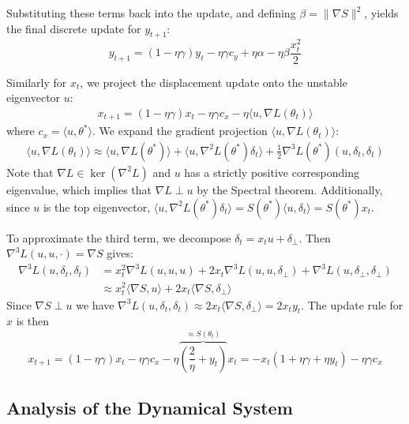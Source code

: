 \documentclass{article}
\begin{document}
Substituting these terms back into the update, and defining $\beta = \|\nabla S\|^2$, yields the final discrete update for $y_{t+1}$:
\begin{equation} \label{eq:y_update_wd}
    y_{t+1} = (1 - \eta\gamma)y_t - \eta\gamma c_y + \eta\alpha - \eta\beta\frac{x_t^2}{2}
\end{equation}

Similarly for $x_t$, we project the displacement update onto the unstable eigenvector $u$:
\begin{align}
    x_{t+1} = (1 - \eta\gamma)x_t - \eta\gamma c_x - \eta \langle u, \nabla L(\theta_t) \rangle
\end{align}
where $c_x=\langle u,\theta^*\rangle$. We expand the gradient projection $\langle u, \nabla L(\theta_t) \rangle$:
\begin{align*}
    \langle u, \nabla L(\theta_t) \rangle \approx \langle u, \nabla L(\theta^*) \rangle + \langle u, \nabla^2 L(\theta^*) \delta_t \rangle + \frac{1}{2} \nabla^3 L(\theta^*)(u, \delta_t, \delta_t)
\end{align*}
Note that $\nabla L \in \ker(\nabla^2 L)$ and $u$ has a strictly positive corresponding eigenvalue, which implies that $\nabla L \perp u$ by the Spectral theorem. Additionally, since $u$ is the top eigenvector, $\langle u, \nabla^2 L(\theta^*) \delta_t \rangle = S(\theta^*) \langle u, \delta_t \rangle = S(\theta^*) x_t$.

To approximate the third term, we decompose $\delta_t = x_t u + \delta_\perp$. Then $\nabla^3 L(u, u, \cdot) = \nabla S$ gives:
\begin{align*}
    \nabla^3 L(u, \delta_t, \delta_t) &= x_t^2 \nabla^3 L(u, u, u) + 2x_t \nabla^3 L(u, u, \delta_\perp) + \nabla^3 L(u, \delta_\perp, \delta_\perp) \\
    &\approx x_t^2 \langle \nabla S, u \rangle + 2x_t \langle \nabla S, \delta_\perp \rangle
\end{align*}
Since $\nabla S \perp u$ we have $\nabla^3L(u,\delta_t,\delta_t)\approx2 x_t\langle\nabla S,\delta_{\perp}\rangle = 2 x_t y_t$. The update rule for $x$ is then
\begin{equation}
    x_{t+1}=(1-\eta\gamma)x_t-\eta\gamma c_x-\eta\overbrace{\left(\frac{2}{\eta}+y_t\right)}^{\approx S(\theta_t)}x_t=-x_t(1+\eta\gamma+\eta y_t)-\eta\gamma c_x
\end{equation}

\subsection{Analysis of the Dynamical System}
\label{app:model_analysis}
\end{document}

